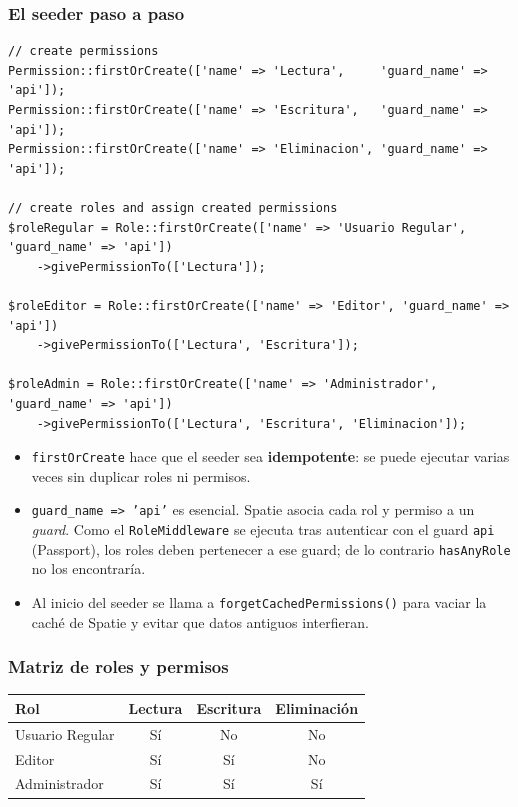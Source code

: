 \subsubsection{El seeder paso a paso}
\begin{lstlisting}[caption={RolesAndPermissionsSeeder::run (fragmento)}]
// create permissions
Permission::firstOrCreate(['name' => 'Lectura',     'guard_name' => 'api']);
Permission::firstOrCreate(['name' => 'Escritura',   'guard_name' => 'api']);
Permission::firstOrCreate(['name' => 'Eliminacion', 'guard_name' => 'api']);

// create roles and assign created permissions
$roleRegular = Role::firstOrCreate(['name' => 'Usuario Regular', 'guard_name' => 'api'])
    ->givePermissionTo(['Lectura']);

$roleEditor = Role::firstOrCreate(['name' => 'Editor', 'guard_name' => 'api'])
    ->givePermissionTo(['Lectura', 'Escritura']);

$roleAdmin = Role::firstOrCreate(['name' => 'Administrador', 'guard_name' => 'api'])
    ->givePermissionTo(['Lectura', 'Escritura', 'Eliminacion']);
\end{lstlisting}

\begin{itemize}
    \item \texttt{firstOrCreate} hace que el seeder sea \textbf{idempotente}: se puede ejecutar varias veces sin duplicar roles ni permisos.
    \item \texttt{guard\_name => 'api'} es esencial. Spatie asocia cada rol y permiso a un \emph{guard}. Como el \texttt{RoleMiddleware} se ejecuta tras autenticar con el guard \texttt{api} (Passport), los roles deben pertenecer a ese guard; de lo contrario \texttt{hasAnyRole} no los encontraría.
    \item Al inicio del seeder se llama a \texttt{forgetCachedPermissions()} para vaciar la caché de Spatie y evitar que datos antiguos interfieran.
\end{itemize}

\subsubsection{Matriz de roles y permisos}
\begin{center}
\begin{tabular}{lccc}
\toprule
\textbf{Rol} & \textbf{Lectura} & \textbf{Escritura} & \textbf{Eliminación} \\
\midrule
Usuario Regular & Sí & No & No \\
Editor & Sí & Sí & No \\
Administrador & Sí & Sí & Sí \\
\bottomrule
\end{tabular}
\end{center}

